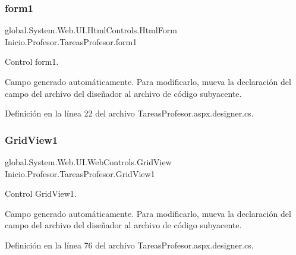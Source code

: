 \mbox{\label{classInicio_1_1Profesor_1_1TareasProfesor_a9eb16c2713fc552af0f0368198a23802}} 
\subsubsection{\texorpdfstring{form1}{form1}}
{\footnotesize\ttfamily global.\+System.\+Web.\+U\+I.\+Html\+Controls.\+Html\+Form Inicio.\+Profesor.\+Tareas\+Profesor.\+form1\hspace{0.3cm}{\ttfamily [protected]}}



Control form1. 

Campo generado automáticamente. Para modificarlo, mueva la declaración del campo del archivo del diseñador al archivo de código subyacente. 

Definición en la línea 22 del archivo Tareas\+Profesor.\+aspx.\+designer.\+cs.

\mbox{\label{classInicio_1_1Profesor_1_1TareasProfesor_aa707588e2b61d0f1dd760bcf6551d1dd}} 
\subsubsection{\texorpdfstring{GridView1}{GridView1}}
{\footnotesize\ttfamily global.\+System.\+Web.\+U\+I.\+Web\+Controls.\+Grid\+View Inicio.\+Profesor.\+Tareas\+Profesor.\+Grid\+View1\hspace{0.3cm}{\ttfamily [protected]}}



Control Grid\+View1. 

Campo generado automáticamente. Para modificarlo, mueva la declaración del campo del archivo del diseñador al archivo de código subyacente. 

Definición en la línea 76 del archivo Tareas\+Profesor.\+aspx.\+designer.\+cs.

\mbox{\label{classInicio_1_1Profesor_1_1TareasProfesor_a82ec862ecf5792f5a8a98d7bd6b9ac88}} 
